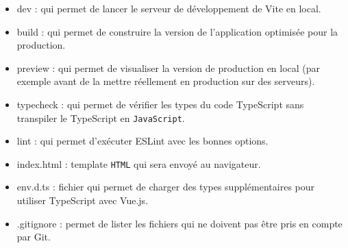 \begin{itemize}
\item {\color{blue} dev} : qui permet de lancer le serveur de développement de {\color{monOrange} Vite} en local.
\item  {\color{blue} build} : qui permet de construire la version de l'application optimisée pour la production.
\item  {\color{blue} preview}  : qui permet de visualiser la version de production en local (par exemple avant de la mettre réellement en production sur des serveurs).
\item  {\color{blue} typecheck}  : qui permet de vérifier les types du code {\color{monOrange} TypeScript} sans transpiler le {\color{monOrange} TypeScript} en {\tt JavaScript}.
\item  {\color{blue} lint}  : qui permet d'exécuter {\color{monOrange} ESLint} avec les bonnes options.
\item  {\color{blue} index.html } : template {\tt HTML} qui sera envoyé au navigateur.
\item  {\color{blue} env.d.ts}  : fichier qui permet de charger des types supplémentaires pour utiliser {\color{monOrange} TypeScript} avec {\color{monOrange} Vue.js}.
\item  {\color{blue} .gitignore}  : permet de lister les fichiers qui ne doivent pas être pris en compte par {\color{monOrange} Git}.


\end{itemize}
